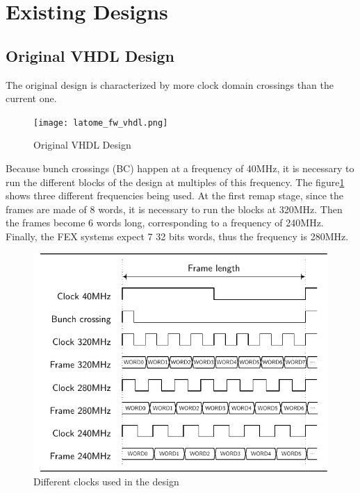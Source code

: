 \section{Existing Designs}\label{sec:existing-design}

\subsection{Original VHDL Design}\label{sec:original-vhdl-design}
The original design is characterized by more clock domain crossings than the current one.

\begin{figure}
    \centering
    \texttt{[image: latome\_fw\_vhdl.png]}
    \caption{Original VHDL Design}
    \label{fig:original-vhdl-design}
\end{figure}

Because bunch crossings (BC) happen at a frequency of 40MHz, it is necessary to run the different blocks of the design at multiples of this frequency. The figure\ref{fig:original-vhdl-design} shows three different frequencies being used. At the first remap stage, since the frames are made of 8 words, it is necessary to run the blocks at 320MHz. Then the frames become 6 words long, corresponding to a frequency of 240MHz. Finally, the FEX systems expect 7 32 bits words, thus the frequency is 280MHz.

\begin{figure}[htb]
    \centering
    \includegraphics{timings/bc_clocks}
    \caption{Different clocks used in the design}
    \label{fig:bc-clocks}
\end{figure}

